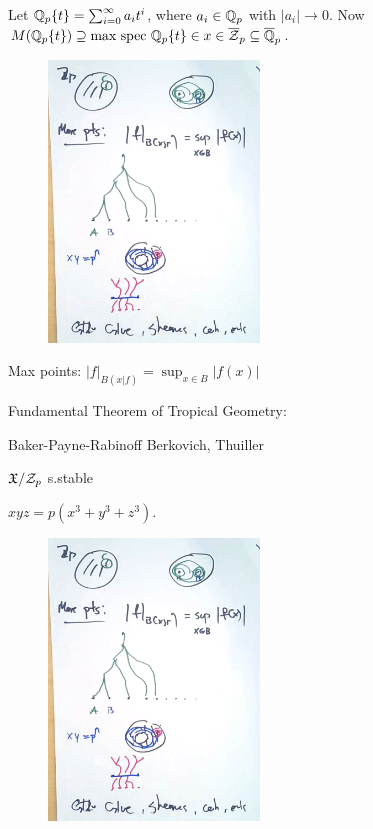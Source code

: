 \begin{ex}
Let $\mathbb{Q}_p\{t\} = \sum_{i=0}^\infty a_i t^i$, where $a_i \in \mathbb{Q}_p$ with $|a_i| \to 0$. Now$M(\mathbb{Q}_p\{t\}) \supseteq \text{max spec } \mathbb{Q}_p\{t\} \in x \in \overline{\mathcal{Z}}_p \subseteq \overline{\mathbb{Q}}_p$. 

	\begin{figure}[!ht]
	\centering
	\includegraphics[width=0.5\textwidth]{../images/im37.png}
	\end{figure}

Max points: $|f|_{B(x|f)}= \sup_{x \in B} |f(x)|$
\end{ex}


Fundamental Theorem of Tropical Geometry:

Baker-Payne-Rabinoff
Berkovich, Thuiller

$\mathfrak{X}/\mathcal{Z}_p$ s.stable

$xyz= p(x^3+y^3+z^3)$.


	\begin{figure}[!ht]
	\centering
	\includegraphics[width=0.5\textwidth]{../images/im37.png}
	\end{figure}

